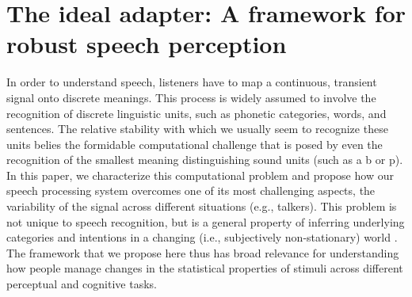 


\chapter{The ideal adapter: A framework for robust speech perception}\label{chap:ideal-adapter}

In order to understand speech, listeners have to map a continuous, transient signal onto discrete meanings. This process is widely assumed to involve the recognition of discrete linguistic units, such as phonetic categories, words, and sentences. The relative stability with which we usually seem to recognize these units belies the formidable computational challenge that is posed by even the recognition of the smallest meaning distinguishing sound units (such as a \ph b or \ph p). In this paper, we characterize this computational problem and propose how our speech processing system overcomes one of its most challenging aspects, the variability of the signal across different situations (e.g., talkers).
This problem is not unique to speech recognition, but is a general property of inferring underlying categories and intentions in a changing (i.e., subjectively non-stationary) world \autocite[see references in][]{Qian2012}.
The framework that we propose here thus has broad relevance for understanding how people manage changes in the statistical properties of stimuli across different perceptual and cognitive tasks.

